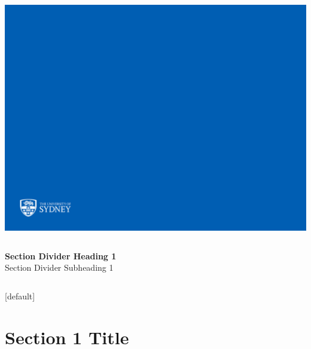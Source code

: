\documentclass{beamer}
\begin{document}
{\includegraphics[width=\paperwidth,height=\paperheight]{sectiondivstd2jun16.pdf}}

\begin{frame}
\vspace{1cm}
\begin{columns}
\column{5.5cm}
{\bf{\color{usydwhite}Section Divider Heading 1}}	\\	%
{\color{usydwhite}Section Divider Subheading 1}			%

\column{6cm}
\end{columns}
\end{frame}


%

[default] 

\section{Section 1 Title}

\end{document}
